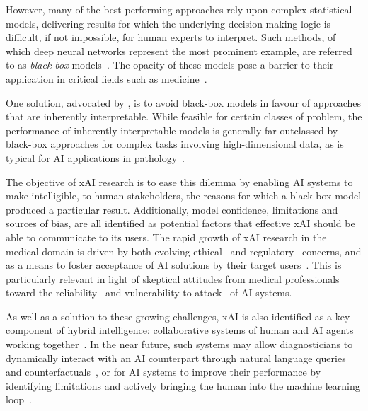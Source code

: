 \documentclass[final,5p,times,twocolumn,hyphens]{elsarticle}
\begin{document}
However, many of the best-performing approaches rely upon complex statistical models, delivering results for which the underlying decision-making logic is difficult, if not impossible, for human experts to interpret. Such methods, of which deep neural networks represent the most prominent example, are referred to as \textit{black-box} models~\cite{Castelvecchi:2016:OpenBlack}. The opacity of these models pose a barrier to their application in critical fields such as medicine~\cite{cui2021artificial}.

One solution, advocated by \citet{Rudin:2019:interpretable}, is to avoid black-box models in favour of approaches that are inherently interpretable. While feasible for certain classes of problem, the performance of inherently interpretable models is generally far outclassed by black-box approaches for complex tasks involving high-dimensional data, as is typical for AI applications in pathology~\cite{arrieta2020explainable, Holzinger:2020:explainable}.

The objective of xAI research is to ease this dilemma by enabling AI systems to make intelligible, to human stakeholders, the reasons for which a black-box model produced a particular result. Additionally, model confidence, limitations and sources of bias, are all identified as potential factors that effective xAI should be able to communicate to its users. The rapid growth of xAI research in the medical domain is driven by both evolving ethical~\cite{MuellerEtAl:2021:TenCommandments} and regulatory~\cite{Schneeberger:2020:legalAI} concerns, and as a means to foster acceptance of AI solutions by their target users~\cite{GuidottiPedreschi:2019:Survey, ProsperiEtAl:2020:CausalHealth, Ferrario:trustmedicalai, gaube:trustmedicalai:2021, kastner2021relation}. This is particularly relevant in light of skeptical attitudes from medical professionals toward the reliability~\cite{quinn:trustmedicalai:2020, tosun_histomapr_2020} and vulnerability to attack~\cite{finlayson2019adversarial, foote2021now} of AI systems.

As well as a solution to these growing challenges, xAI is also identified as a key component of hybrid intelligence: collaborative systems of human and AI agents working together~\cite{hemmer2021human}. In the near future, such systems may allow diagnosticians to dynamically interact with an AI counterpart through natural language queries and counterfactuals~\cite{HolzingerEtAl:2021:GraphFusion, tosun_histomapr_2020}, or for AI systems to improve their performance by identifying limitations and actively bringing the human into the machine learning loop~\cite{Holzinger:2020:explainable}.
\end{document}
